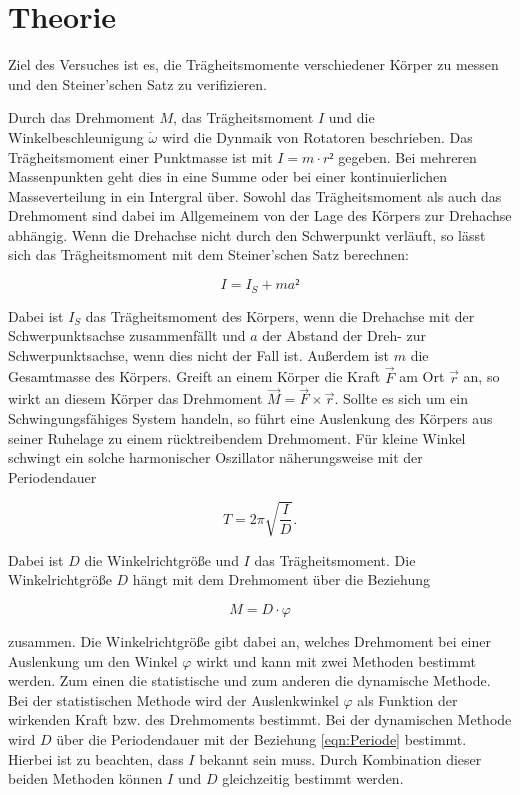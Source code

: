 \section{Theorie}
\label{sec:Theorie}

Ziel des Versuches ist es, die Trägheitsmomente verschiedener Körper 
zu messen und den Steiner'schen Satz zu verifizieren.

Durch das Drehmoment $M$, das Trägheitsmoment $I$ und die Winkelbeschleunigung 
$\dot\omega$ wird die Dynmaik von Rotatoren beschrieben. Das Trägheitsmoment
einer Punktmasse ist mit $I = m\cdot r²$ gegeben. Bei mehreren Massenpunkten
geht dies in eine Summe oder bei einer kontinuierlichen Masseverteilung 
in ein Intergral über. Sowohl das Trägheitsmoment als auch das Drehmoment 
sind dabei im Allgemeinem von der Lage des Körpers zur Drehachse abhängig. 
Wenn die Drehachse nicht durch den Schwerpunkt verläuft, so lässt sich das
Trägheitsmoment mit dem Steiner'schen Satz berechnen: 

\begin{equation}
I = I_S + ma² 
\label{Steiner}
\end{equation}

Dabei ist $I_S$ das Trägheitsmoment des Körpers, wenn die Drehachse mit der 
Schwerpunktsachse zusammenfällt und $a$ der Abstand der Dreh- zur Schwerpunktsachse, 
wenn dies nicht der Fall ist. Außerdem ist $m$ die Gesamtmasse des Körpers.
Greift an einem Körper die Kraft $\vec{F}$ am Ort $\vec{r}$ an, so wirkt 
an diesem Körper das Drehmoment $\vec{M} = \vec{F} \times \vec{r}$. Sollte es
sich um ein Schwingungsfähiges System handeln, so führt eine Auslenkung des 
Körpers aus seiner Ruhelage zu einem rücktreibendem Drehmoment. Für kleine
Winkel schwingt ein solche harmonischer Oszillator näherungsweise mit 
der Periodendauer

\begin{equation}
T = 2\pi\sqrt{\frac{I}{D}}.
\label{eqn:Periode}
\end{equation}

Dabei ist $D$ die Winkelrichtgröße und $I$ das Trägheitsmoment. Die 
Winkelrichtgröße $D$ hängt mit dem Drehmoment über die Beziehung 

\begin{equation}
M = D\cdot\varphi
\label{eqn:Winkelrichtgröße}
\end{equation}

zusammen. Die Winkelrichtgröße gibt dabei an, welches Drehmoment bei einer 
Auslenkung um den Winkel $\varphi$ wirkt und kann mit zwei Methoden bestimmt 
werden. Zum einen die statistische und zum anderen die dynamische Methode. 
Bei der statistischen Methode wird der Auslenkwinkel $\varphi$ als Funktion
der wirkenden Kraft bzw. des Drehmoments bestimmt. Bei der dynamischen 
Methode wird $D$ über die Periodendauer mit der Beziehung \eqref{eqn:Periode}
bestimmt. Hierbei ist zu beachten, dass $I$ bekannt sein muss. 
Durch Kombination dieser beiden Methoden können $I$ und $D$ gleichzeitig
bestimmt werden. 

